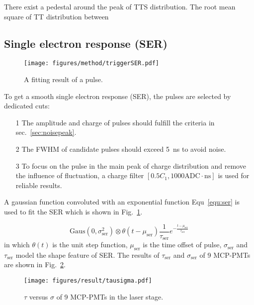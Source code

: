 There exist a pedestal around the peak of TTS distribution. The root mean square of TT distribution between
\subsection{Single electron response (SER)}
\begin{figure}
    \centering
    \texttt{[image: figures/method/triggerSER.pdf]}
    \caption{A fitting result of a pulse.}
    \label{fig:triggerser}
\end{figure}
To get a smooth single electron response (SER), the pulses are selected by dedicated cuts:
\begin{itemize}
    \item[1] The amplitude and charge of pulses should fulfill the criteria in sec.~\ref{sec:noisepeak}.
    \item[2] The FWHM of candidate pulses should exceed \SI{5}{ns} to avoid noise.
    \item[3] To focus on the pulse in the main peak of charge distribution and remove the influence of fluctuation, a charge filter $[0.5C_1, 1000\mathrm{ADC\cdot ns}]$ is used for reliable results.
\end{itemize}

A gaussian function convoluted with an exponential function Equ~\eqref{equ:ser} is used to fit the SER which is shown in Fig.~\ref{fig:triggerser}.

\begin{equation}
    \label{equ:ser}
    \mathrm{Gaus}(0,\sigma_{\mathrm{ser}}^2)\otimes\theta(t-\mu_{\mathrm{ser}})\frac{1}{\tau_{\mathrm{ser}}}e^{-\frac{t-\mu_{\mathrm{ser}}}{\tau_{\mathrm{ser}}}}
\end{equation}
in which $\theta(t)$ is the unit step function, $\mu_{\mathrm{ser}}$ is the time offset of pulse, $\sigma_{\mathrm{ser}}$ and $\tau_{\mathrm{ser}}$ model the shape feature of SER. The results of $\tau_{\mathrm{ser}}$ and $\sigma_{\mathrm{ser}}$ of 9 MCP-PMTs are shown in Fig.~\ref{fig:sigmaCompare}.
\begin{figure}[!htbp]
    \centering
    \texttt{[image: figures/result/tausigma.pdf]}
    \caption{$\tau$ versus $\sigma$ of 9 MCP-PMTs in the laser stage.}
    \label{fig:sigmaCompare}
\end{figure}


